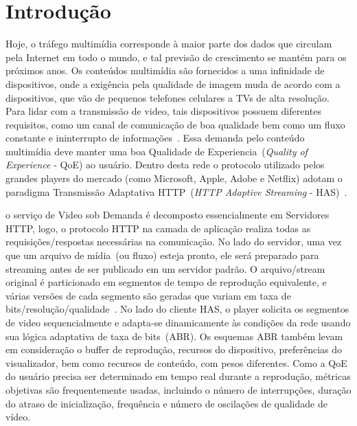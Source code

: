 \section{Introdução}
\label{sec:intro}

Hoje, o tráfego multimídia corresponde à maior parte dos dados que circulam pela Internet em todo o mundo, e tal previsão de crescimento se mantém  para os próximos anos. Os conteúdos multimídia são fornecidos a uma infinidade de dispositivos, onde a exigência pela qualidade de imagem muda de acordo com a dispositivos, que vão de pequenos telefones celulares a TVs de alta resolução. Para lidar com a transmissão de video, tais dispositivos possuem diferentes requisitos, como um canal de comunicação de boa qualidade bem como um fluxo constante e ininterrupto de informações~\cite{Immich2018WinNet}. 
Essa demanda pelo conteúdo multimídia deve manter uma boa Qualidade de Experiencia~(\textit{Quality of Experience} - QoE) ao usuário.
Dentro desta rede o protocolo utilizado pelos grandes players do mercado (como Microsoft, Apple, Adobe e Netflix) adotam o paradigma Transmissão Adaptativa HTTP~(\textit{HTTP Adaptive Streaming} - HAS)~\cite{company:dashs}.

o serviço de Video sob Demanda é decomposto essencialmente em Servidores HTTP, logo, o protocolo HTTP na camada de aplicação realiza todas as requisições/respostas necessárias na comunicação. No lado do servidor, uma vez que um arquivo de mídia~(ou fluxo) esteja pronto, ele será preparado para streaming antes de ser publicado em um servidor padrão. O arquivo/stream original é particionado em segmentos de tempo de reprodução equivalente, e várias versões de  cada segmento são geradas que variam em taxa de bits/resolução/qualidade~\cite{Zhang:TransM13}.
%
No lado do cliente HAS, o player solicita os segmentos de video sequencialmente e adapta-se dinamicamente às condições da rede usando sua lógica adaptativa de taxa de bits~(ABR). Os esquemas ABR também levam em consideração o buffer de reprodução, recursos do dispositivo, preferências do visualizador, bem como recursos de conteúdo, com pesos diferentes.
Como a QoE do usuário precisa ser determinado em tempo real durante a reprodução, métricas objetivas são frequentemente usadas, incluindo o número de interrupções, duração do atraso de inicialização, frequência e número de oscilações de qualidade de vídeo.


